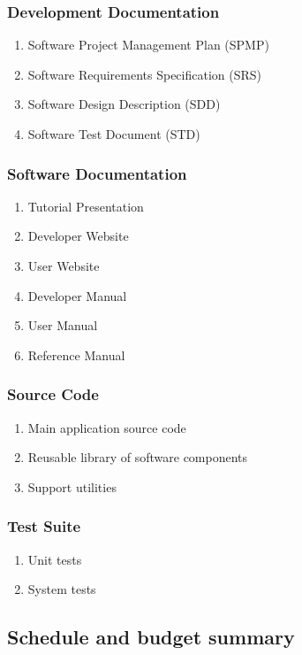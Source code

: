 \documentclass{article}[12pt]
\begin{document}
\subsubsection{Development Documentation}

\begin{enumerate}
\item Software Project Management Plan (SPMP)
\item Software Requirements Specification (SRS)
\item Software Design Description (SDD)
\item Software Test Document (STD)
\end{enumerate}

\subsubsection{Software Documentation}
\begin{enumerate}
\item Tutorial Presentation
\item Developer Website
\item User Website
\item Developer Manual
\item User Manual
\item Reference Manual
\end{enumerate}

\subsubsection{Source Code}
\begin{enumerate}
\item Main application source code
\item Reusable library of software components
\item Support utilities
\end{enumerate}

\subsubsection{Test Suite}
\begin{enumerate}
\item Unit tests
\item System tests
\end{enumerate}

\subsection{Schedule and budget summary}
\end{document}
